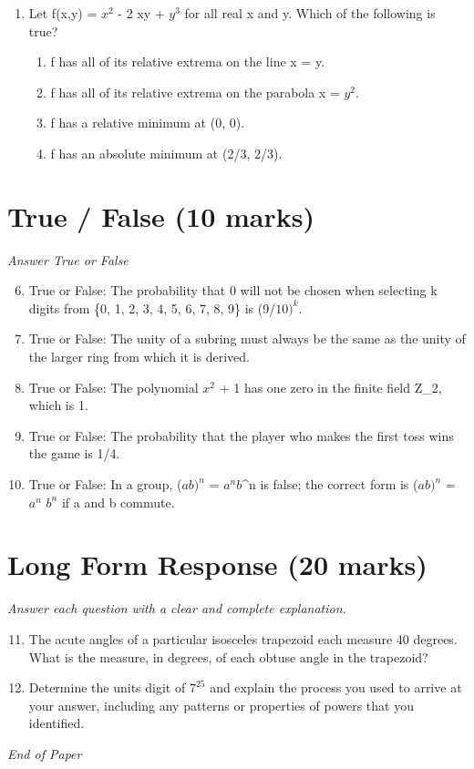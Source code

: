 \documentclass[12pt]{article}
\begin{document}
\begin{enumerate}[label=\arabic*.]
\begin{enumerate}[label=(\alph*)]
    \item -1
\end{enumerate}
\item Let f(x,y) = $x^2$ - 2 xy + $y^3$ for all real x and y. Which of the following is true?
\begin{enumerate}[label=(\alph*)]
    \item f has all of its relative extrema on the line x = y.
    \item f has all of its relative extrema on the parabola x = $y^2$.
    \item f has a relative minimum at (0, 0).
    \item f has an absolute minimum at (2/3, 2/3).
\end{enumerate}
\end{enumerate}

\section*{True / False (10 marks)}
\textit{Answer True or False}
\begin{enumerate}[label=\arabic*.]
\setcounter{enumi}{5}
\item True or False: The probability that 0 will not be chosen when selecting k digits from \{0, 1, 2, 3, 4, 5, 6, 7, 8, 9\} is (9/$10)^k$.
\item True or False: The unity of a subring must always be the same as the unity of the larger ring from which it is derived.
\item True or False: The polynomial $x^2$ + 1 has one zero in the finite field Z\_2, which is 1.
\item True or False: The probability that the player who makes the first toss wins the game is 1/4.
\item True or False: In a group, ($ab)^n$ = $a^nb$^n is false; the correct form is ($ab)^n$ = $a^n$ $b^n$ if a and b commute.
\end{enumerate}

\section*{Long Form Response (20 marks)}
\textit{Answer each question with a clear and complete explanation.}
\begin{enumerate}[label=\arabic*.]
\setcounter{enumi}{10}
\item The acute angles of a particular isosceles trapezoid each measure 40 degrees. What is the measure, in degrees, of each obtuse angle in the trapezoid?
\item Determine the units digit of $7^25$ and explain the process you used to arrive at your answer, including any patterns or properties of powers that you identified.
\end{enumerate}

\vfill
\noindent\textit{End of Paper}
\end{document}
